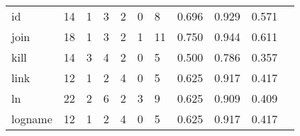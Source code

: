 \begin{longtable}{lp{1.2cm}p{1.2cm}p{1.2cm}p{1.2cm}p{1.2cm}p{1.2cm}p{1.2cm}p{1.2cm}p{1.2cm}p{1.2cm}}
id        &                                    14 &                                                  1 &                                                  3 &                                                  2 &                                                  0 &                                                  8 &                                              0.696 &                                              0.929 &                                              0.571 \\
join      &                                    18 &                                                  1 &                                                  3 &                                                  2 &                                                  1 &                                                 11 &                                              0.750 &                                              0.944 &                                              0.611 \\
kill      &                                    14 &                                                  3 &                                                  4 &                                                  2 &                                                  0 &                                                  5 &                                              0.500 &                                              0.786 &                                              0.357 \\
link      &                                    12 &                                                  1 &                                                  2 &                                                  4 &                                                  0 &                                                  5 &                                              0.625 &                                              0.917 &                                              0.417 \\
ln        &                                    22 &                                                  2 &                                                  6 &                                                  2 &                                                  3 &                                                  9 &                                              0.625 &                                              0.909 &                                              0.409 \\
logname   &                                    12 &                                                  1 &                                                  2 &                                                  4 &                                                  0 &                                                  5 &                                              0.625 &                                              0.917 &                                              0.417 \\

\end{longtable}
